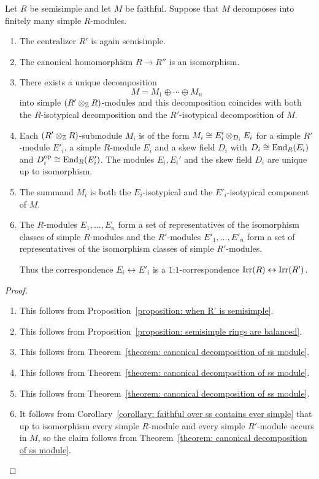 \begin{theorem}
  \label{theorem: general double centralizer theorem}
  Let $R$ be semisimple and let $M$ be faithful.
  Suppose that $M$ decomposes into finitely many simple $R$-modules.
  \begin{enumerate}
    \item
      The centralizer $R'$ is again semisimple.
    \item
      The canonical homomorphism $R \to R''$ is an isomorphism.
    \item
      There exists a unique decomposition
      \[
          M
        = M_1 \oplus \dotsb \oplus M_n
      \]
      into simple $(R' \mathbin{\otimes}_{\mathbb{Z}} R)$-modules and this decomposition coincides with both the $R$-isotypical decomposition and the $R'$-isotypical decomposition of $M$.
    \item
      Each $(R' \mathbin{\otimes}_{\mathbb{Z}} R)$-submodule $M_i$ is of the form $M_i \cong E'_i \mathbin{\otimes}_{D_i} E_i$ for a simple $R'$-module $E'_i$, a simple $R$-module $E_i$ and a skew field $D_i$ with $D_i \cong \operatorname{End}_R(E_i)$ and $D_i^{\operatorname{op}} \cong \operatorname{End}_R(E'_i)$.
      The modules $E_i, E_i'$ and the skew field $D_i$ are unique up to isomorphism.
    \item
      The summand $M_i$ is both the $E_i$-isotypical and the $E'_i$-isotypical component of $M$.
    \item
      The $R$-modules $E_1, \dotsc, E_n$ form a set of representatives of the isomorphism classes of simple $R$-modules and the $R'$-modules $E'_1, \dotsc, E'_n$ form a set of representatives of the isomorphism classes of simple $R'$-modules.
      
      Thus the correspondence $E_i \leftrightarrow E'_i$ is a $1$:$1$-correspondence $\operatorname{Irr}(R) \leftrightarrow \operatorname{Irr}(R')$.
  \end{enumerate}
\end{theorem}


\begin{proof}
  \leavevmode
  \begin{enumerate}
    \item
      This follows from Proposition~\ref{proposition: when R' is semisimple}.
    \item
      This follows from Proposition~\ref{proposition: semisimple rings are balanced}.
    \item
      This follows from Theorem~\ref{theorem: canonical decomposition of ss module}.
    \item
      This follows from Theorem~\ref{theorem: canonical decomposition of ss module}.
    \item
      This follows from Theorem~\ref{theorem: canonical decomposition of ss module}.
    \item
      It follows from Corollary~\ref{corollary: faithful over ss contains ever simple} that up to isomorphism every simple $R$-module and every simple $R'$-module occurs in $M$, so the claim follows from Theorem~\ref{theorem: canonical decomposition of ss module}.
    \qedhere
  \end{enumerate}
\end{proof}


